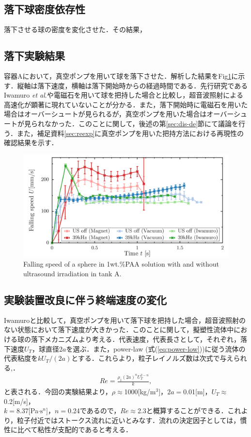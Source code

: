 \subsection{落下球密度依存性}

落下させる球の密度を変化させた．その結果，


\subsection{落下実験結果}

容器Aにおいて，真空ポンプを用いて球を落下させた．解析した結果をFig\ref{fig:falling-A}に示す．縦軸は落下速度，横軸は落下開始時からの経過時間である．先行研究であるIwamuro \textit{et al}.\cite{ref:8}や電磁石を用いて球を把持した場合と比較し，超音波照射による高速化が顕著に現れていないことが分かる．また，落下開始時に電磁石を用いた場合はオーバーシュートが見られるが，真空ポンプを用いた場合はオーバーシュートが見られなかった．このことに関して，後述の第\ref{sec:dis-de}節にて議論を行う．また，補足資料\ref{sec:reexp}に真空ポンプを用いた把持方法における再現性の確認結果を示す．

\begin{figure}[ht]
    \centering
    \includegraphics[width=12cm,clip]{./4-Results/s1-A.png}
    \caption{Falling speed of a sphere in 1wt.\%PAA solution with and without ultrasound irradiation in tank A.}
    \label{fig:falling-A}
\end{figure}

\subsection{実験装置改良に伴う終端速度の変化}

Iwamuro\cite{ref:8}と比較して，真空ポンプを用いて落下球を把持した場合，超音波照射のない状態において落下速度が大きかった．このことに関して，擬塑性流体中における球の落下メカニズムより考える．代表速度，代表長さとして，それぞれ，落下速度$U_T$，球直径$2a$を選ぶ．また，power-law (式(\ref{eq:power-low}))に従う流体の代表粘度を$k U_T/(2a)$とする．これらより，粒子レイノルズ数は次式で与えられる\cite{ref:1},\cite{ref:8-5}．
\begin{eqnarray}
    Re = \frac{\rho_1 \left(2a\right)^n U_T^{2-n}}{k} ,
\end{eqnarray}
と表される\cite{ref:1,ref:8-5}．今回の実験結果より，$\rho \approx$1000[kg/m${}^3$]，$2a =$0.01[m]，$U_T \approx$0.2[m/s]，\\$k =$8.37[Pa$\cdot \text{s}^n]$，$n =$0.24であるので，$Re \approx$2.3と概算することができる．これより，粒子付近ではストークス流れに近いとみなす．流れの決定因子としては，慣性に比べて粘性が支配的であると考える．

